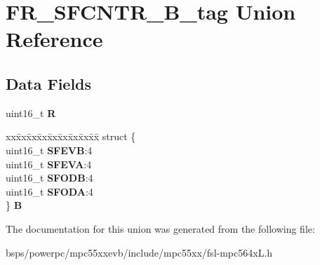 \hypertarget{unionFR__SFCNTR__16B__tag}{}\section{F\+R\+\_\+\+S\+F\+C\+N\+T\+R\+\_\+B\+\_\+tag Union Reference}
\label{unionFR__SFCNTR__16B__tag}
\subsection*{Data Fields}
\begin{DoxyCompactItemize}
\item 
\mbox{\label{unionFR__SFCNTR__16B__tag_a7aa6df7f825bc5c66ff9d9b05038eb51}} 
uint16\+\_\+t {\bfseries R}
\item 
\mbox{\label{unionFR__SFCNTR__16B__tag_a8133f1bc0bd48971a0c6af099d32ccc9}} 
\begin{tabbing}
xx\=xx\=xx\=xx\=xx\=xx\=xx\=xx\=xx\=\kill
struct \{\\
\>uint16\_t {\bfseries SFEVB}:4\\
\>uint16\_t {\bfseries SFEVA}:4\\
\>uint16\_t {\bfseries SFODB}:4\\
\>uint16\_t {\bfseries SFODA}:4\\
\} {\bfseries B}\\

\end{tabbing}\end{DoxyCompactItemize}


The documentation for this union was generated from the following file\+:\begin{DoxyCompactItemize}
\item 
bsps/powerpc/mpc55xxevb/include/mpc55xx/fsl-\/mpc564x\+L.\+h\end{DoxyCompactItemize}
